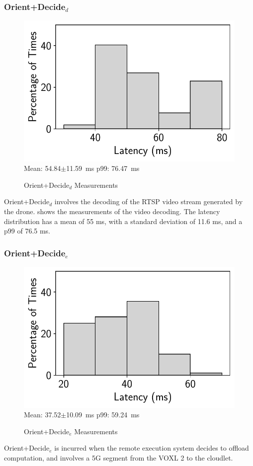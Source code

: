 \subsubsection*{Orient+Decide$_{d}$}

\begin{figure}[htbp]
    \centering
    \includegraphics[width = .4\textwidth]{figs/voxl-decoding-time.pdf}\\
\small{Mean: 54.84$\pm$11.59~ms\; p99: 76.47~ms}\\
\caption{Orient+Decide$_d$ Measurements}
\label{fig:voxl2-decoding-latency}
\end{figure}

Orient+Decide$_d$ involves the decoding of the RTSP video stream generated
by the drone.  shows the measurements of
the video decoding. The latency distribution has a mean of 55 ms, with a
standard deviation of 11.6 ms, and a p99 of 76.5 ms.

\subsubsection*{Orient+Decide$_{e}$}

\begin{figure}[htbp]
    \centering
    \includegraphics[width = .4\textwidth]{figs/voxl-5g-latency.pdf}\\
\small{Mean: 37.52$\pm$10.09~ms\; p99: 59.24~ms}\\
\caption{Orient+Decide$_e$ Measurements}
\label{fig:voxl2-5g-latency}
\end{figure}

Orient+Decide$_e$ is incurred when the remote execution system decides to
offload computation, and involves a 5G segment from the VOXL 2 to the cloudlet.

